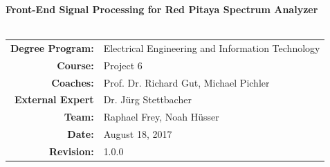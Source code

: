 \documentclass[a4paper,oneside]{alpenspecs/alpenspecs}
\begin{document}
\begin{titlingpage}
    \flushright\sffamily
    \enlargethispage{10ex}

    \vspace*{5em}
    
    \Huge\bfseries{Front-End Signal Processing for Red Pitaya Spectrum Analyzer}\\[1ex]
    \Large{}\\[3ex]

    \normalsize\mdseries

    

    \vfill
    \begin{tabular}{>{\bfseries}rl}
        Degree Program: & Electrical Engineering and Information Technology \\[2mm]
        Course:         & Project \num{6}\\[2mm]
        Coaches:        & Prof. Dr. Richard Gut, Michael Pichler \\[2mm]
        External Expert & Dr. J\"urg Stettbacher \\[2mm]
        Team:           & Raphael Frey, Noah H\"usser \\[2mm]
        Date:           & August 18, 2017 \\[2mm]
        Revision:       & 1.0.0 \\[2mm]
    \end{tabular}

    \tikzexternaldisable
    \tikzexternalenable
\end{titlingpage} %
\end{document}
